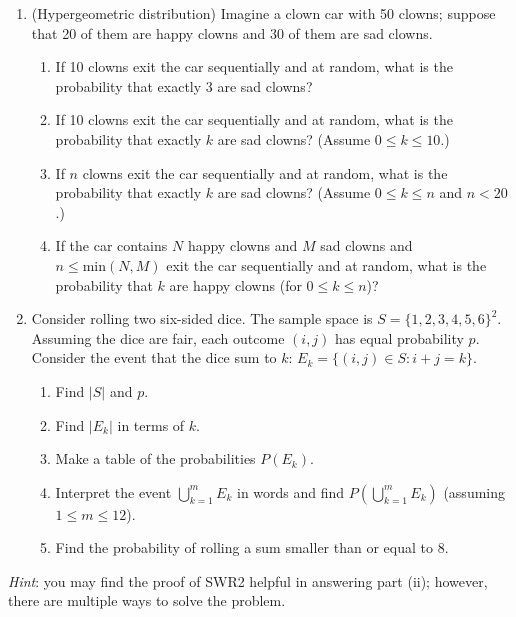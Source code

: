 \documentclass[
  letterpaper,
  DIV=11,
  numbers=noendperiod]{scrartcl}
\providecommand{\tightlist}{%
  \setlength{\itemsep}{0pt}\setlength{\parskip}{0pt}}\usepackage{longtable,booktabs,array}
\begin{document}
\begin{enumerate}
\def\labelenumi{\arabic{enumi}.}
\item
  (Hypergeometric distribution) Imagine a clown car with 50 clowns;
  suppose that 20 of them are happy clowns and 30 of them are sad
  clowns.

  \begin{enumerate}
  \def\labelenumii{\roman{enumii}.}
  \tightlist
  \item
    If 10 clowns exit the car sequentially and at random, what is the
    probability that exactly 3 are sad clowns?
  \item
    If 10 clowns exit the car sequentially and at random, what is the
    probability that exactly \(k\) are sad clowns? (Assume
    \(0\leq k \leq 10\).)
  \item
    If \(n\) clowns exit the car sequentially and at random, what is the
    probability that exactly \(k\) are sad clowns? (Assume
    \(0 \leq k \leq n\) and \(n < 20\).)
  \item
    If the car contains \(N\) happy clowns and \(M\) sad clowns and
    \(n \leq \text{min}(N, M)\) exit the car sequentially and at random,
    what is the probability that \(k\) are happy clowns (for
    \(0 \leq k \leq n\))?
  \end{enumerate}
\item
  Consider rolling two six-sided dice. The sample space is
  \(S = \{1, 2, 3, 4, 5, 6\}^2\). Assuming the dice are fair, each
  outcome \((i, j)\) has equal probability \(p\). Consider the event
  that the dice sum to \(k\): \(E_k = \{(i, j)\in S: i + j = k\}\).

  \begin{enumerate}
  \def\labelenumii{\roman{enumii}.}
  \tightlist
  \item
    Find \(|S|\) and \(p\).
  \item
    Find \(|E_k|\) in terms of \(k\).
  \item
    Make a table of the probabilities \(P(E_k)\).
  \item
    Interpret the event \(\bigcup_{k = 1}^m E_k\) in words and find
    \(P\left(\bigcup_{k = 1}^m E_k\right)\) (assuming
    \(1\leq m \leq 12\)).
  \item
    Find the probability of rolling a sum smaller than or equal to 8.
  \end{enumerate}
\end{enumerate}

\emph{Hint}: you may find the proof of SWR2 helpful in answering part
(ii); however, there are multiple ways to solve the problem.
\end{document}
